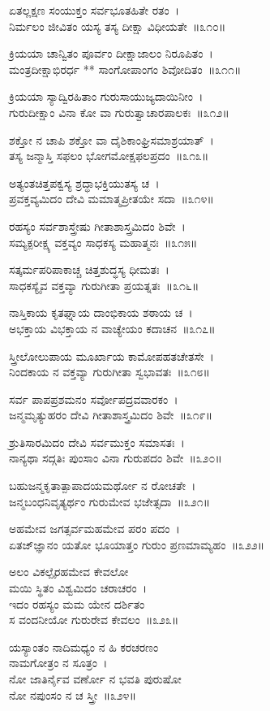 ಏತಲ್ಲಕ್ಷಣ ಸಂಯುಕ್ತಂ ಸರ್ವಭೂತಹಿತೇ ರತಂ~।\\
ನಿರ್ಮಲಂ ಜೀವಿತಂ ಯಸ್ಯ ತಸ್ಯ ದೀಕ್ಷಾ ವಿಧೀಯತೇ~॥೩೧೦॥

ಕ್ರಿಯಯಾ ಚಾನ್ವಿತಂ ಪೂರ್ವಂ ದೀಕ್ಷಾಜಾಲಂ ನಿರೂಪಿತಂ~।\\
ಮಂತ್ರದೀಕ್ಷಾಭಿರರ್ಧ ** ಸಾಂಗೋಪಾಂಗಂ ಶಿವೋದಿತಂ~॥೩೧೧॥

ಕ್ರಿಯಯಾ ಸ್ಯಾದ್ವಿರಹಿತಾಂ ಗುರುಸಾಯುಜ್ಯದಾಯಿನೀಂ~।\\
ಗುರುದೀಕ್ಷಾಂ ವಿನಾ ಕೋ ವಾ ಗುರುತ್ವಾಚಾರಪಾಲಕಃ~॥೩೧೨॥

ಶಕ್ತೋ ನ ಚಾಪಿ ಶಕ್ತೋ ವಾ ದೈಶಿಕಾಂಘ್ರಿಸಮಾಶ್ರಯಾತ್~।\\
ತಸ್ಯ ಜನ್ಮಾಸ್ತಿ ಸಫಲಂ ಭೋಗಮೋಕ್ಷಫಲಪ್ರದಂ~॥೩೧೩॥

ಅತ್ಯಂತಚಿತ್ತಪಕ್ವಸ್ಯ ಶ್ರದ್ಧಾಭಕ್ತಿಯುತಸ್ಯ ಚ~।\\
ಪ್ರವಕ್ತವ್ಯಮಿದಂ ದೇವಿ ಮಮಾತ್ಮಪ್ರೀತಯೇ ಸದಾ~॥೩೧೪॥

ರಹಸ್ಯಂ ಸರ್ವಶಾಸ್ತ್ರೇಷು ಗೀತಾಶಾಸ್ತ್ರಮಿದಂ ಶಿವೇ~।\\
ಸಮ್ಯಕ್ಪರೀಕ್ಷ್ಯ ವಕ್ತವ್ಯಂ ಸಾಧಕಸ್ಯ ಮಹಾತ್ಮನಃ~॥೩೧೫॥

ಸತ್ಕರ್ಮಪರಿಪಾಕಾಚ್ಚ ಚಿತ್ತಶುದ್ಧಸ್ಯ ಧೀಮತಃ~।\\
ಸಾಧಕಸ್ಯೈವ ವಕ್ತವ್ಯಾ ಗುರುಗೀತಾ ಪ್ರಯತ್ನತಃ~॥೩೧೬॥

ನಾಸ್ತಿಕಾಯ ಕೃತಘ್ನಾಯ ದಾಂಭಿಕಾಯ ಶಠಾಯ ಚ~।\\
ಅಭಕ್ತಾಯ ವಿಭಕ್ತಾಯ ನ ವಾಚ್ಯೇಯಂ ಕದಾಚನ~॥೩೧೭॥

ಸ್ತ್ರೀಲೋಲುಪಾಯ ಮೂರ್ಖಾಯ ಕಾಮೋಪಹತಚೇತಸೇ~।\\
ನಿಂದಕಾಯ ನ ವಕ್ತವ್ಯಾ ಗುರುಗೀತಾ ಸ್ವಭಾವತಃ~॥೩೧೮॥

ಸರ್ವ ಪಾಪಪ್ರಶಮನಂ ಸರ್ವೋಪದ್ರವವಾರಕಂ~।\\
ಜನ್ಮಮೃತ್ಯುಹರಂ ದೇವಿ ಗೀತಾಶಾಸ್ತ್ರಮಿದಂ ಶಿವೇ~॥೩೧೯॥

ಶ್ರುತಿಸಾರಮಿದಂ ದೇವಿ ಸರ್ವಮುಕ್ತಂ ಸಮಾಸತಃ~।\\
ನಾನ್ಯಥಾ ಸದ್ಗತಿಃ ಪುಂಸಾಂ ವಿನಾ ಗುರುಪದಂ ಶಿವೇ~॥೩೨೦॥

ಬಹುಜನ್ಮಕೃತಾತ್ಪಾಪಾದಯಮರ್ಥೋ ನ ರೋಚತೇ~।\\
ಜನ್ಮಬಂಧನಿವೃತ್ಯರ್ಥಂ ಗುರುಮೇವ ಭಜೇತ್ಸದಾ~॥೩೨೧॥

ಅಹಮೇವ ಜಗತ್ಸರ್ವಮಹಮೇವ ಪರಂ ಪದಂ~।\\
ಏತಜ್‌ಜ್ಞಾನಂ ಯತೋ ಭೂಯಾತ್ತಂ ಗುರುಂ ಪ್ರಣಮಾಮ್ಯಹಂ~॥೩೨೨॥

ಅಲಂ ವಿಕಲ್ಪೈರಹಮೇವ ಕೇವಲೋ\\ ಮಯಿ ಸ್ಥಿತಂ ವಿಶ್ವಮಿದಂ ಚರಾಚರಂ~।\\
ಇದಂ ರಹಸ್ಯಂ ಮಮ ಯೇನ ದರ್ಶಿತಂ\\ ಸ ವಂದನೀಯೋ ಗುರುರೇವ ಕೇವಲಂ~॥೩೨೩॥

ಯಸ್ಯಾಂತಂ ನಾದಿಮಧ್ಯಂ ನ ಹಿ ಕರಚರಣಂ \\ನಾಮಗೋತ್ರಂ ನ ಸೂತ್ರಂ~।\\
ನೋ ಜಾತಿರ್ನೈವ ವರ್ಣೋ ನ ಭವತಿ ಪುರುಷೋ\\ ನೋ ನಪುಂಸಂ ನ ಚ ಸ್ತ್ರೀ~॥೩೨೪॥

